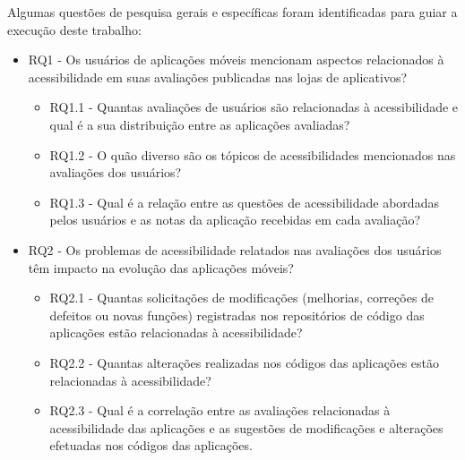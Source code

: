 Algumas questões de pesquisa gerais e específicas foram identificadas para guiar a execução deste trabalho:
\begin{itemize}
 \item RQ1 - Os usuários de aplicações móveis mencionam aspectos relacionados à acessibilidade em suas avaliações publicadas nas lojas de aplicativos?
    \begin{itemize}
       \item RQ1.1 - Quantas avaliações de usuários são relacionadas à acessibilidade e qual é a sua distribuição entre as aplicações avaliadas?
       \item RQ1.2 - O quão diverso são os tópicos de acessibilidades mencionados nas avaliações dos usuários?
       \item RQ1.3 - Qual é a relação entre as questões de acessibilidade abordadas pelos usuários e as notas da aplicação recebidas em cada avaliação?
 \end{itemize}
  \item RQ2 - Os problemas de acessibilidade relatados nas avaliações dos usuários têm impacto na evolução das aplicações móveis?
        \begin{itemize}
        \item RQ2.1 - Quantas solicitações de modificações (melhorias, correções de defeitos ou novas funções) registradas nos repositórios de código das aplicações estão relacionadas à acessibilidade?
        \item RQ2.2 - Quantas alterações realizadas nos códigos das aplicações estão relacionadas à acessibilidade?
        \item RQ2.3 - Qual é a correlação entre as avaliações relacionadas à acessibilidade das aplicações e as sugestões de modificações e alterações efetuadas nos códigos das aplicações.
        \end{itemize}
\end{itemize}


